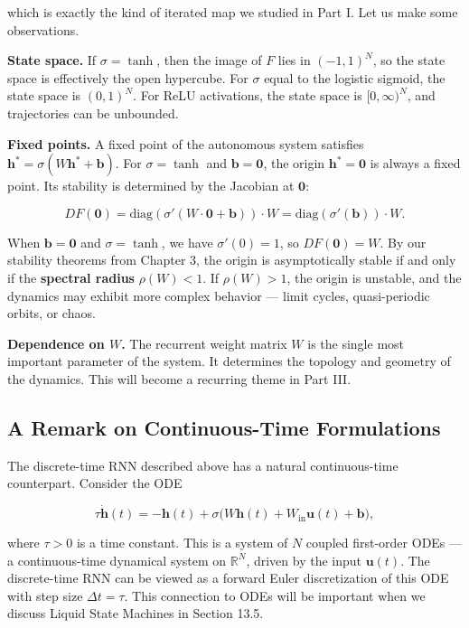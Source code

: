 which is exactly the kind of iterated map we studied in Part I. Let us make some observations.

\textbf{State space.} If $\sigma = \tanh$, then the image of $F$ lies in $(-1,1)^N$, so the state space is effectively the open hypercube. For $\sigma$ equal to the logistic sigmoid, the state space is $(0,1)^N$. For ReLU activations, the state space is $[0,\infty)^N$, and trajectories can be unbounded.

\textbf{Fixed points.} A fixed point of the autonomous system satisfies $\mathbf{h}^* = \sigma(W\mathbf{h}^* + \mathbf{b})$. For $\sigma = \tanh$ and $\mathbf{b} = \mathbf{0}$, the origin $\mathbf{h}^* = \mathbf{0}$ is always a fixed point. Its stability is determined by the Jacobian at $\mathbf{0}$:

\[
DF(\mathbf{0}) = \text{diag}(\sigma'(W \cdot \mathbf{0} + \mathbf{b})) \cdot W = \text{diag}(\sigma'(\mathbf{b})) \cdot W.
\]

When $\mathbf{b} = \mathbf{0}$ and $\sigma = \tanh$, we have $\sigma'(0) = 1$, so $DF(\mathbf{0}) = W$. By our stability theorems from Chapter 3, the origin is asymptotically stable if and only if the \textbf{spectral radius} $\rho(W) < 1$. If $\rho(W) > 1$, the origin is unstable, and the dynamics may exhibit more complex behavior --- limit cycles, quasi-periodic orbits, or chaos.

\textbf{Dependence on $W$.} The recurrent weight matrix $W$ is the single most important parameter of the system. It determines the topology and geometry of the dynamics. This will become a recurring theme in Part III.

\subsection{A Remark on Continuous-Time Formulations}\label{sec:13.2.3}

The discrete-time RNN described above has a natural continuous-time counterpart. Consider the ODE

\[
\tau \dot{\mathbf{h}}(t) = -\mathbf{h}(t) + \sigma\!\big(W\mathbf{h}(t) + W_{\text{in}}\mathbf{u}(t) + \mathbf{b}\big),
\]

where $\tau > 0$ is a time constant. This is a system of $N$ coupled first-order ODEs --- a continuous-time dynamical system on $\mathbb{R}^N$, driven by the input $\mathbf{u}(t)$. The discrete-time RNN can be viewed as a forward Euler discretization of this ODE with step size $\Delta t = \tau$. This connection to ODEs will be important when we discuss Liquid State Machines in Section 13.5.


